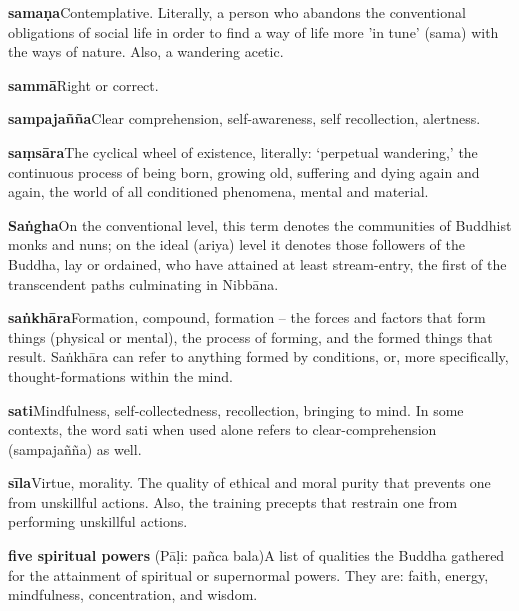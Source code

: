 {\textbf{samaṇa}\hspace{\glosskip}Contemplative. Literally, a person who abandons the 
conventional obligations of social life in order to find a way of life 
more 'in tune' (sama) with the ways of nature. Also, a wandering acetic.

\textbf{sammā}\hspace{\glosskip}Right or correct.

\textbf{sampajañña}\hspace{\glosskip}Clear comprehension, self-awareness, self 
recollection, alertness.

\textbf{saṃsāra}\hspace{\glosskip}The cyclical wheel of existence, literally: 
`perpetual wandering,' the continuous process of being born, growing 
old, suffering and dying again and again, the world of all conditioned 
phenomena, mental and material.

\textbf{Saṅgha}\hspace{\glosskip}On the conventional level, this term denotes the 
communities of Buddhist monks and nuns; on the ideal (ariya) level it 
denotes those followers of the Buddha, lay or ordained, who have 
attained at least stream-entry, the first of the transcendent paths 
culminating in Nibbāna.

\textbf{saṅkhāra}\hspace{\glosskip}Formation, compound, formation – the forces and 
factors that form things (physical or mental), the process of forming, 
and the formed things that result. Saṅkhāra can refer to anything 
formed by conditions, or, more specifically, thought-formations within 
the mind.

\textbf{sati}\hspace{\glosskip}Mindfulness, self-collectedness, recollection, bringing 
to mind. In some contexts, the word sati when used alone refers to 
clear-comprehension (sampajañña) as well.

\textbf{sīla}\hspace{\glosskip}Virtue, morality. The quality of ethical and moral 
purity that prevents one from unskillful actions. Also, the training 
precepts that restrain one from performing unskillful actions.

\textbf{five spiritual powers} (Pāḷi: pañca bala)\hspace{\glosskip}A list of 
qualities the Buddha gathered for the attainment of spiritual or 
supernormal powers. They are: faith, energy, mindfulness, 
concentration, and wisdom.

}
